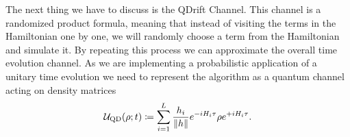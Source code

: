 The next thing we have to discuss is the QDrift Channel. This channel is a randomized product formula, meaning that instead of visiting the terms in the Hamiltonian one by one, we will randomly choose a term from the Hamiltonian and simulate it. By repeating this process we can approximate the overall time evolution channel. As we are implementing a probabilistic application of a unitary time evolution we need to represent the algorithm as a quantum channel acting on density matrices
\begin{equation}
    \mathcal{U}_{\rm QD}(\rho; t) \coloneqq \sum_{i = 1}^L \frac{h_i}{\norm{h}} e^{-i H_i \tau} \rho e^{+i H_i \tau}.
\end{equation}









